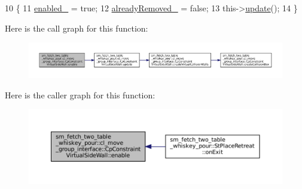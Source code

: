 \begin{DoxyCode}
10         \{
11             \hyperlink{classsm__fetch__two__table__whiskey__pour_1_1cl__move__group__interface_1_1CpConstraintVirtualSideWall_afdb21410cf37966fbdf12366ebc6dd02}{enabled\_} = \textcolor{keyword}{true};
12             \hyperlink{classsm__fetch__two__table__whiskey__pour_1_1cl__move__group__interface_1_1CpConstraintVirtualSideWall_a9aa0925adf4664e66f5cb5235ca4eeba}{alreadyRemoved\_} = \textcolor{keyword}{false};
13             this->\hyperlink{classsm__fetch__two__table__whiskey__pour_1_1cl__move__group__interface_1_1CpConstraintVirtualSideWall_a0d810890cc65189012a33af233d18c9f}{update}();
14         \}
\end{DoxyCode}
Here is the call graph for this function\+:
\nopagebreak
\begin{figure}[H]
\begin{center}
\leavevmode
\includegraphics[width=350pt]{classsm__fetch__two__table__whiskey__pour_1_1cl__move__group__interface_1_1CpConstraintVirtualSideWall_a3664ab7add203ea576aa6f575b50b4a3_cgraph}
\end{center}
\end{figure}
Here is the caller graph for this function\+:
\nopagebreak
\begin{figure}[H]
\begin{center}
\leavevmode
\includegraphics[width=350pt]{classsm__fetch__two__table__whiskey__pour_1_1cl__move__group__interface_1_1CpConstraintVirtualSideWall_a3664ab7add203ea576aa6f575b50b4a3_icgraph}
\end{center}
\end{figure}
\mbox{\label{classsm__fetch__two__table__whiskey__pour_1_1cl__move__group__interface_1_1CpConstraintVirtualSideWall_a00d9f7eea9e5b91d4d2154c37e56f60e}} 
